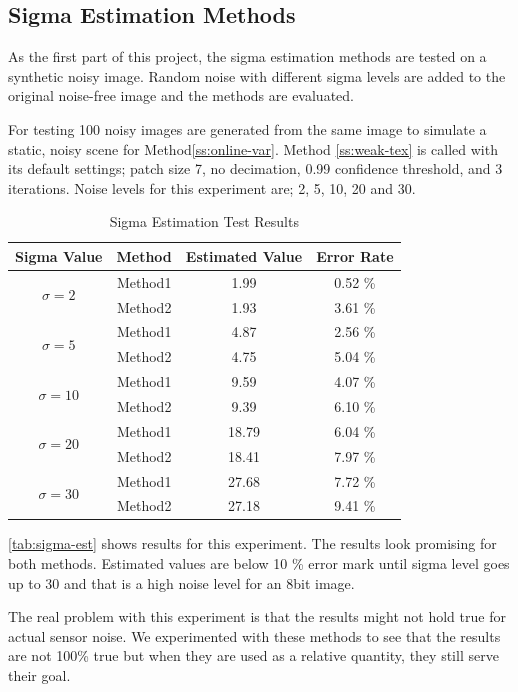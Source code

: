 \documentclass[10pt,twocolumn,letterpaper]{article}
\begin{document}
\subsection{Sigma Estimation Methods}
As the first part of this project, the sigma estimation methods are tested on a synthetic noisy image. Random noise with different sigma levels are added to the original noise-free image and the methods are evaluated.

For testing 100 noisy images are generated from the same image to simulate a static, noisy scene for Method\ref{ss:online-var}. Method \ref{ss:weak-tex} is called with its default settings; patch size 7, no decimation, 0.99 confidence threshold, and 3 iterations. Noise levels for this experiment are; 2, 5, 10, 20 and 30.

\begin{table}[h!]
	\centering
	\caption{Sigma Estimation Test Results}
	\label{tab:sigma-est}
	\begin{tabular}{cccc}
		\toprule
		\bfseries Sigma Value & \bfseries Method & \bfseries Estimated Value & \bfseries Error Rate\\
		\midrule
		\multirow{2}{*}{\(\sigma=2\)} & Method1 & 1.99 & 0.52 \% \\
		& Method2 & 1.93 & 3.61 \% \\
		\midrule
		\multirow{2}{*}{\(\sigma=5\)} & Method1 & 4.87 & 2.56 \% \\
		& Method2 & 4.75 & 5.04 \% \\
		\midrule
		\multirow{2}{*}{\(\sigma=10\)} & Method1 & 9.59 & 4.07 \% \\
		& Method2 & 9.39 & 6.10 \% \\
		\midrule
		\multirow{2}{*}{\(\sigma=20\)} & Method1 & 18.79 & 6.04 \% \\
		& Method2 & 18.41 & 7.97 \% \\
		\midrule
		\multirow{2}{*}{\(\sigma=30\)} & Method1 & 27.68 & 7.72 \% \\
		& Method2 & 27.18 & 9.41 \% \\
		\bottomrule
	\end{tabular}
\end{table}

\autoref{tab:sigma-est} shows results for this experiment. The results look promising for both methods. Estimated values are below 10 \% error mark until sigma level goes up to 30 and that is a high noise level for an 8bit image.

The real problem with this experiment is that the results might not hold true for actual sensor noise. We experimented with these methods to see that the results are not 100\% true but when they are used as a relative quantity, they still serve their goal.
\end{document}
